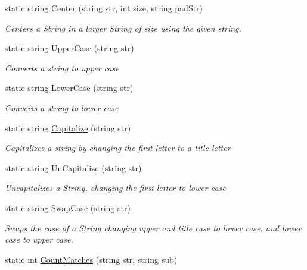 \begin{DoxyCompactItemize}
static string \hyperlink{class_ultimate_1_1_utilities_1_1_string_utils_a0656fd12285fba0f10f223643014d3e1}{Center} (string str, int size, string pad\+Str)
\begin{DoxyCompactList}\small\item\em Centers a String in a larger String of size using the given string. \end{DoxyCompactList}\item 
static string \hyperlink{class_ultimate_1_1_utilities_1_1_string_utils_ad94e17629defd07ce14bb9d50f42dc62}{Upper\+Case} (string str)
\begin{DoxyCompactList}\small\item\em Converts a string to upper case \end{DoxyCompactList}\item 
static string \hyperlink{class_ultimate_1_1_utilities_1_1_string_utils_a268e4be096c634a042de0ae93b60e435}{Lower\+Case} (string str)
\begin{DoxyCompactList}\small\item\em Converts a string to lower case \end{DoxyCompactList}\item 
static string \hyperlink{class_ultimate_1_1_utilities_1_1_string_utils_a17c46fa6384d1ed327a08a80a3e36aee}{Capitalize} (string str)
\begin{DoxyCompactList}\small\item\em Capitalizes a string by changing the first letter to a title letter \end{DoxyCompactList}\item 
static string \hyperlink{class_ultimate_1_1_utilities_1_1_string_utils_a6daf76f270c4459f62311ca132b0255c}{Un\+Capitalize} (string str)
\begin{DoxyCompactList}\small\item\em Uncapitalizes a String, changing the first letter to lower case \end{DoxyCompactList}\item 
static string \hyperlink{class_ultimate_1_1_utilities_1_1_string_utils_a48a3cb054e7e5cbf3f2d709e1de166fd}{Swap\+Case} (string str)
\begin{DoxyCompactList}\small\item\em Swaps the case of a String changing upper and title case to lower case, and lower case to upper case. \end{DoxyCompactList}\item 
static int \hyperlink{class_ultimate_1_1_utilities_1_1_string_utils_a329e8926a23a8d47dfda9f198c23beb6}{Count\+Matches} (string str, string sub)

\end{DoxyCompactItemize}

